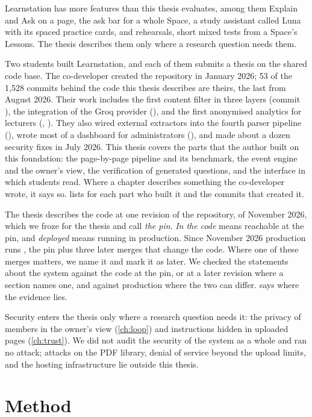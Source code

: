 Learnstation has more features than this thesis evaluates, among them Explain
and Ask on a page, the ask bar for a whole Space, a study assistant called
Luna with its spaced practice cards, and rehearsals, short mixed tests from a
Space's Lessons. The thesis describes them only where a research question
needs them.

Two students built Learnstation, and each of them submits a thesis on the shared code base. The co-developer created the repository in
January 2026; 53 of the 1{,}528 commits behind the code this thesis describes
are theirs, the last from August 2026. Their work includes the first content filter in three layers
(commit ), the integration of the Groq provider
(), and the first anonymised analytics for lecturers
(, ). They also wired external extractors into
the fourth parser pipeline (), wrote most of a dashboard for
administrators (), and made about a dozen security fixes in
July 2026. This thesis covers the parts that the author built on this foundation: the
page-by-page pipeline and its benchmark, the event engine and the owner's
view, the verification of generated questions, and the interface in which
students read. Where a chapter describes something the co-developer wrote, it
says so.  lists for each part who built it and the commits
that created it.

The thesis describes the code at one revision of the repository,
\code{\thesisCommit} of November 2026, which we froze for the thesis and call
\emph{the pin}. \emph{In the code} means reachable at the pin, and
\emph{deployed} means running in production. Since November 2026 production
runs , the pin plus three later merges that change the code. Where one of these
merges matters, we name it and mark it as later. We checked the statements
about the system against the code at the pin, or at a later revision where a
section names one, and against production where the two can differ.
 says where the evidence lies.

Security enters the thesis only where a research question needs it: the
privacy of members in the owner's view (\cref{ch:loop}) and instructions
hidden in uploaded pages (\cref{ch:trust}). We did not audit the security of
the system as a whole and ran no attack; attacks on the PDF library, denial of
service beyond the upload limits, and the hosting infrastructure lie outside
this thesis.

\section{Method}
\label{sec:method-note}

